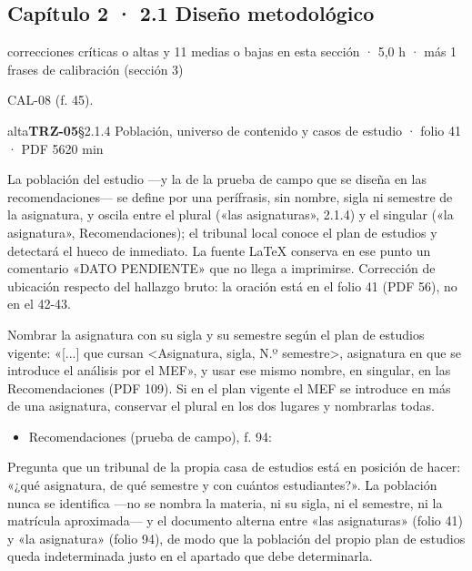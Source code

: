 \subsection{Capítulo 2 · 2.1 Diseño metodológico}
{\small\color{gris} correcciones críticas o altas y 11 medias o bajas en esta sección · 5,0 h · más 1 frases de calibración (sección 3)}\par
{\small{}CAL-08 (f. 45).\par}
\begin{ficha}{alta}{\casilla\textbf{TRZ-05}\quad{}\quad §2.1.4 Población, universo de contenido y casos de estudio · folio 41 · PDF 56\hfill 20 min}
\par
{}La población del estudio —y la de la prueba de campo que se diseña en las recomendaciones— se define por una perífrasis, sin nombre, sigla ni semestre de la asignatura, y oscila entre el plural («las asignaturas», 2.1.4) y el singular («la asignatura», Recomendaciones); el tribunal local conoce el plan de estudios y detectará el hueco de inmediato. La fuente LaTeX conserva en ese punto un comentario «DATO PENDIENTE» que no llega a imprimirse. Corrección de ubicación respecto del hallazgo bruto: la oración está en el folio 41 (PDF 56), no en el 42-43.\par
{}Nombrar la asignatura con su sigla y su semestre según el plan de estudios vigente: «[...]\allowbreak{} que cursan \textless{}Asignatura, sigla, N.º semestre\textgreater{}, asignatura en que se introduce el análisis por el MEF», y usar ese mismo nombre, en singular, en las Recomendaciones (PDF 109). Si en el plan vigente el MEF se introduce en más de una asignatura, conservar el plural en los dos lugares y nombrarlas todas.\par
{}\begin{itemize}[leftmargin=1.2em,itemsep=1pt,topsep=1pt]
\item {\small Recomendaciones (prueba de campo), f. 94: }
\end{itemize}
{\small\color{gris}Pregunta que un tribunal de la propia casa de estudios está en posición de hacer: «¿qué asignatura, de qué semestre y con cuántos estudiantes?». La población nunca se identifica —no se nombra la materia, ni su sigla, ni el semestre, ni la matrícula aproximada— y el documento alterna entre «las asignaturas» (folio 41) y «la asignatura» (folio 94), de modo que la población del propio plan de estudios queda indeterminada justo en el apartado que debe determinarla.\par}

\end{ficha}
